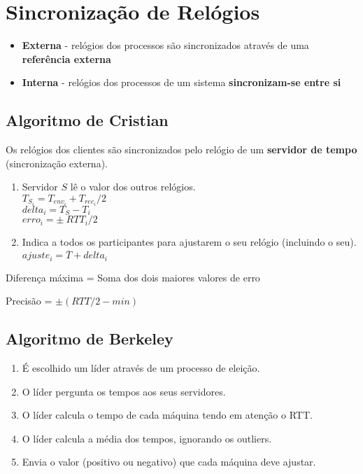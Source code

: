 \documentclass[12pt]{article}
\begin{document}
\newpage

\section{Sincronização de Relógios}

\begin{itemize}
    \item \textbf{Externa} - relógios dos processos são sincronizados através de uma \textbf{referência externa}
    \item \textbf{Interna} - relógios dos processos de um sistema \textbf{sincronizam-se entre si}
\end{itemize}

\subsection{Algoritmo de Cristian}

Os relógios dos clientes são sincronizados pelo relógio de um \textbf{servidor de tempo} (sincronização externa).

\begin{enumerate}
    \item Servidor $S$ lê o valor dos outros relógios. \\[2pt]
        $T_{S_i} = T_{env_i} + T_{rec_i}/2$ \\
        $delta_i = T_S - T_i$ \\
        $erro_i = \pm\ RTT_i/2$
    \item Indica a todos os participantes para ajustarem o seu relógio (incluindo o seu). \\[2pt]
        $ajuste_i = \overline{T} + delta_i $
\end{enumerate}

Diferença máxima = Soma dos dois maiores valores de erro

Precisão = $\pm \left(RTT/2 - min\right) $

\subsection{Algoritmo de Berkeley}

\begin{enumerate}
    \item É escolhido um líder através de um processo de eleição.
    \item O líder pergunta os tempos aos seus servidores.
    \item O líder calcula o tempo de cada máquina tendo em atenção o RTT.
    \item O líder calcula a média dos tempos, ignorando os outliers.
    \item Envia o valor (positivo ou negativo) que cada máquina deve ajustar.
\end{enumerate}
\end{document}
